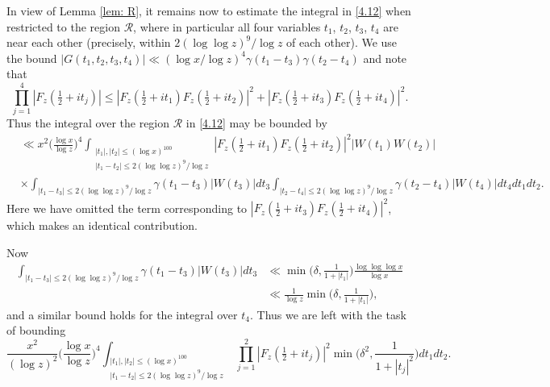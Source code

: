 \documentclass[12pt, notitlepage]{amsart}
\numberwithin{equation}{section}
\theoremstyle{remark}
\theoremstyle{definition}
\theoremstyle{remark}
\numberwithin{equation}{section}
\begin{document}
\vspace{12pt}
   In view of Lemma \ref{lem: R}, it remains now to estimate the integral in \eqref{4.12} when restricted to the region ${\mathcal R}$, where in particular all four variables $t_1$, $t_2$, $t_3$, $t_4$ are near each other (precisely, within $2(\log \log z)^9/\log z$ of each other).  We use the bound 
$|G(t_1,t_2,t_3,t_4)| \ll (\log x/\log z)^4 \gamma(t_1 -t_3) \gamma(t_2-t_4)$ and note that 
$$ 
\prod_{j=1}^{4} |F_z(\tfrac 12+it_j)| \le |F_z(\tfrac 12+it_1)F_z(\tfrac 12+it_2)|^2 + |F_z(\tfrac 12+it_3) F_z(\tfrac 12+it_4)|^2. 
$$ 
Thus the integral over the region ${\mathcal R}$ in \eqref{4.12} may be bounded by 
\begin{align*}
&\ll x^2 \Big( \frac{\log x}{\log z}\Big)^4 \int_{\substack{|t_1|, |t_2| \le (\log x)^{100}\\ |t_1 -t_2| \le 2 (\log \log z)^9/\log z}} |F_z(\tfrac 12+it_1)F_z(\tfrac 12+it_2)|^2 |W(t_1) W(t_2)| \\
&\times \int_{|t_1-t_3| \le 2(\log \log z)^9/\log z} \gamma(t_1-t_3) |W(t_3)| dt_3 \int_{|t_2-t_4|\le 2 (\log \log z)^9/\log z} \gamma(t_2-t_4) |W(t_4)| dt_4 dt_1 dt_2. 
\end{align*}
Here we have omitted the term corresponding to $|F_z(\tfrac 12+it_3)F_z(\tfrac 12+it_4)|^2$, which makes an identical contribution.  


Now 
\begin{align*}
 \int_{|t_1-t_3| \le 2(\log \log z)^9/\log z} \gamma(t_1-t_3) |W(t_3)| dt_3 &\ll \min\Big(\delta, \frac{1}{1+|t_1|}\Big) \frac{\log \log \log x}{\log x}\\
 & \ll \frac{1}{\log z} \min \Big(\delta, \frac{1}{1+|t_1|}\Big), 
 \end{align*} 
 and a similar bound holds for the integral over $t_4$.   Thus we are left with the task of bounding
\begin{equation} 
\label{4.19} 
\frac{x^2}{(\log z)^2} \Big(\frac{\log x}{\log z}\Big)^4 \int_{\substack{|t_1|, |t_2| \le (\log x)^{100}\\ |t_1 -t_2| \le 2 (\log \log z)^9/\log z}} \prod_{j=1}^{2} 
|F_z(\tfrac 12+it_j)|^2 
\min\Big(\delta^2,\frac{1}{1+|t_j|^2}\Big) dt_1dt_2. 
\end{equation} 
\end{document}
